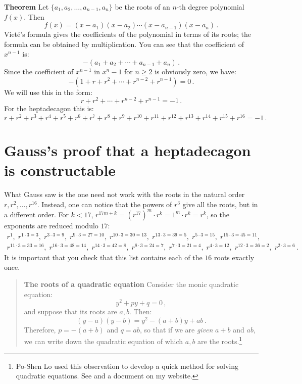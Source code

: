 \documentclass[11pt,a4paper]{article}
\newenvironment{form}[1]{%
\begin{displaymath}%
\renewcommand{\arraystretch}{#1}%
\begin{array}{lcl}}%
{\end{array}%
\end{displaymath}%
}
\begin{document}
\textbf{Theorem} Let $\{a_1,a_2,\ldots,a_{n-1},a_n\}$ be the roots of an $n$-th degree polynomial $f(x)$. Then 
\[
f(x) =(x-a_1) (x-a_2)\cdots (x-a_{n-1})(x-a_n)\,.
\]
Viet\'{e}'s formula \cite[p. 28]{jorg} gives the coefficients of the polynomial in terms of its roots; the formula can be obtained by multiplication. You can see that the coefficient of $x^{n-1}$ is:
\[
-(a_1+a_2+\cdots+a_{n-1}+a_n)\,.
\]
Since the coefficient of $x^{n-1}$ in $x^n-1$ for $n\geq 2$ is obviously zero, we have:
\[
-(1+r+r^2+\cdots + r^{n-2}+r^{n-1})=0\,.
\]
We will use this in the form:
\[
r+r^2+\cdots + r^{n-2}+r^{n-1}=-1\,.
\]
For the heptadecagon this is:
\[
r+r^2+r^3+r^4+r^5+r^6+r^7+r^8+r^9+r^{10}+r^{11}+r^{12}+r^{13}+r^{14} + r^{15}+r^{16}=-1\,.
\]


\section{Gauss's proof that a heptadecagon is constructable}\label{s.gauss}

What Gauss saw is the one need not work with the roots in the natural order $r,r^2,\ldots,r^{16}$. Instead, one can notice that the powers of $r^3$ give all the roots, but in a different order. For $k<17$, $r^{17m+k}=(r^{17})^m\cdot r^k=1^m\cdot r^k=r^k$, so the exponents are reduced modulo $17$:
\begin{form}{1.2}
r^1, \;r^{1\cdot 3 =3},\; r^{3\cdot 3=9},\; r^{9\cdot 3=27=10},\; r^{10\cdot 3=30=13},\; r^{13\cdot 3=39=5},\; r^{5\cdot 3=15},\; r^{15\cdot 3=45=11},&&\\
r^{11\cdot 3 =33=16}, \;r^{16\cdot 3=48=14},\; r^{14\cdot 3=42=8},\; r^{8\cdot 3=24=7},\;r^{7\cdot 3=21=4},\; r^{4\cdot 3=12},\; r^{12\cdot 3=36=2},\; r^{2\cdot 3=6}\,.&&
\end{form}
It is important that you check that this list contains each of the $16$ roots exactly once.

\vspace{-1ex}
\begin{quote}
\textbf{The roots of a quadratic equation} Consider the monic quadratic equation:
\[
y^2+py+q=0\,,
\]
and suppose that its roots are $a,b$. Then:
\[
(y-a)(y-b)=y^2 - (a+b)y + ab\,.
\]
Therefore, $p=-(a+b)$ and $q=ab$, so that if we are \emph{given} $a+b$ and $ab$, we can write down the quadratic equation of which $a,b$ are the roots.\footnote{Po-Shen Lo used this observation to develop a quick method for solving quadratic equations. See \cite{lo}
and a document on my website.}
\end{quote}
\vspace{-1ex}
\end{document}

